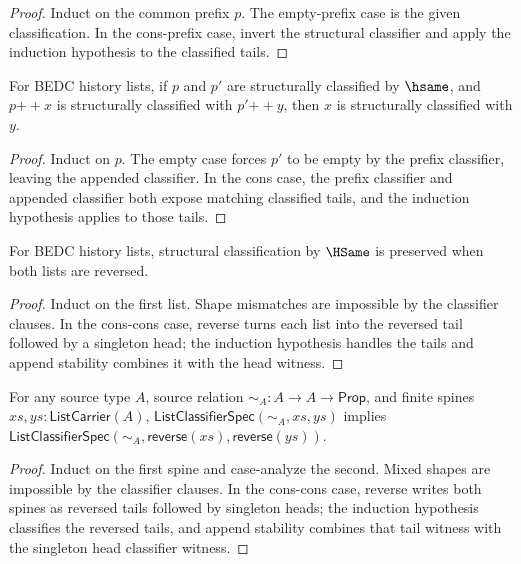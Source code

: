 \begin{proof}
Induct on the common prefix \(p\). The empty-prefix case is the given
classification. In the cons-prefix case, invert the structural classifier and
apply the induction hypothesis to the classified tails.
\end{proof}

\begin{theorem}
\label{thm:list-classifier-hsame-append-left-cancel-classified}
For BEDC history lists, if \(p\) and \(p'\) are structurally classified by
\(\hsame\), and \(p{++}x\) is structurally classified with \(p'{++}y\), then
\(x\) is structurally classified with \(y\).
\end{theorem}
\begin{proof}
Induct on \(p\). The empty case forces \(p'\) to be empty by the prefix
classifier, leaving the appended classifier. In the cons case, the prefix
classifier and appended classifier both expose matching classified tails, and
the induction hypothesis applies to those tails.
\end{proof}

\begin{theorem}
\label{thm:list-classifier-reverse-hsame}
For BEDC history lists, structural classification by $\HSame$ is preserved when both lists are reversed.
\end{theorem}
\begin{proof}
Induct on the first list. Shape mismatches are impossible by the classifier clauses. In the cons-cons case, reverse turns each list into the reversed tail followed by a singleton head; the induction hypothesis handles the tails and append stability combines it with the head witness.
\end{proof}

\begin{theorem}
\label{thm:list-classifier-reverse-source-relation}
For any source type $A$, source relation $\sim_A:A\to A\to\mathsf{Prop}$, and finite spines $xs,ys:\mathsf{ListCarrier}(A)$, $\mathsf{ListClassifierSpec}(\sim_A,xs,ys)$ implies $\mathsf{ListClassifierSpec}(\sim_A,\mathsf{reverse}(xs),\mathsf{reverse}(ys))$.
\end{theorem}
\begin{proof}
Induct on the first spine and case-analyze the second. Mixed shapes are impossible by the classifier clauses. In the cons-cons case, reverse writes both spines as reversed tails followed by singleton heads; the induction hypothesis classifies the reversed tails, and append stability combines that tail witness with the singleton head classifier witness.
\end{proof}

